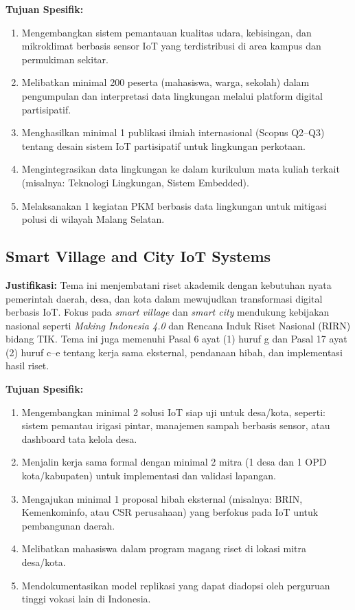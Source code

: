 \documentclass[12pt,a4paper]{article}
\begin{document}
\textbf{Tujuan Spesifik:}
\begin{enumerate}[leftmargin=*]
    \item Mengembangkan sistem pemantauan kualitas udara, kebisingan, dan mikroklimat berbasis sensor IoT yang terdistribusi di area kampus dan permukiman sekitar.
    \item Melibatkan minimal 200 peserta (mahasiswa, warga, sekolah) dalam pengumpulan dan interpretasi data lingkungan melalui platform digital partisipatif.
    \item Menghasilkan minimal 1 publikasi ilmiah internasional (Scopus Q2–Q3) tentang desain sistem IoT partisipatif untuk lingkungan perkotaan.
    \item Mengintegrasikan data lingkungan ke dalam kurikulum mata kuliah terkait (misalnya: Teknologi Lingkungan, Sistem Embedded).
    \item Melaksanakan 1 kegiatan PKM berbasis data lingkungan untuk mitigasi polusi di wilayah Malang Selatan.
\end{enumerate}

\subsection{Smart Village and City IoT Systems}

\textbf{Justifikasi:}
Tema ini menjembatani riset akademik dengan kebutuhan nyata pemerintah daerah, desa, dan kota dalam mewujudkan transformasi digital berbasis IoT. Fokus pada \textit{smart village} dan \textit{smart city} mendukung kebijakan nasional seperti \textit{Making Indonesia 4.0} dan Rencana Induk Riset Nasional (RIRN) bidang TIK. Tema ini juga memenuhi Pasal 6 ayat (1) huruf g dan Pasal 17 ayat (2) huruf c–e tentang kerja sama eksternal, pendanaan hibah, dan implementasi hasil riset.

\textbf{Tujuan Spesifik:}
\begin{enumerate}[leftmargin=*]
    \item Mengembangkan minimal 2 solusi IoT siap uji untuk desa/kota, seperti: sistem pemantau irigasi pintar, manajemen sampah berbasis sensor, atau dashboard tata kelola desa.
    \item Menjalin kerja sama formal dengan minimal 2 mitra (1 desa dan 1 OPD kota/kabupaten) untuk implementasi dan validasi lapangan.
    \item Mengajukan minimal 1 proposal hibah eksternal (misalnya: BRIN, Kemenkominfo, atau CSR perusahaan) yang berfokus pada IoT untuk pembangunan daerah.
    \item Melibatkan mahasiswa dalam program magang riset di lokasi mitra desa/kota.
    \item Mendokumentasikan model replikasi yang dapat diadopsi oleh perguruan tinggi vokasi lain di Indonesia.
\end{enumerate}
\end{document}
